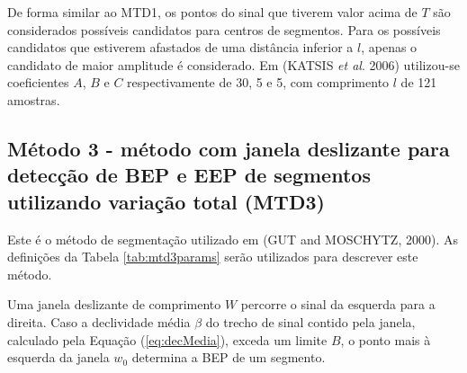 De forma similar ao MTD1, os pontos do sinal que tiverem valor acima de $T$ são considerados possíveis candidatos para centros de segmentos. Para os possíveis candidatos que estiverem afastados de uma distância inferior a $l$, apenas o candidato de maior amplitude é considerado. Em (KATSIS \emph{et al}. 2006) utilizou-se coeficientes $A$, $B$ e $C$ respectivamente de 30, 5 e 5, com comprimento $l$ de 121 amostras.

\subsection{Método 3 - método com janela deslizante para detecção de BEP e EEP de segmentos utilizando variação total (MTD3)}

	Este é o método de segmentação utilizado em (GUT and MOSCHYTZ, 2000). As definições da Tabela \ref{tab:mtd3params} serão utilizados para descrever este método.
	
\begin{table}[htb]
\end{table}

Uma janela deslizante de comprimento $W$ percorre o sinal da esquerda para a direita. Caso a declividade média $\beta$ do trecho de sinal contido pela janela, calculado pela Equação (\ref{eq:decMedia}), exceda um limite $B$, o ponto mais à esquerda da janela $w_0$ determina a BEP de um segmento.

